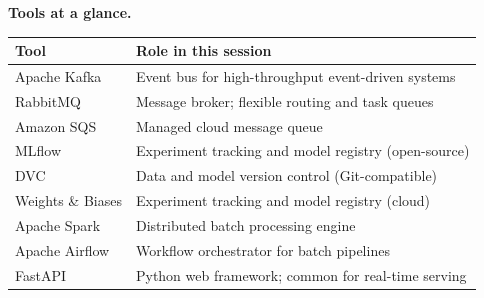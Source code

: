\documentclass[a4paper,11pt]{article}
\begin{document}
\medskip
\noindent\textbf{Tools at a glance.}
\begin{center}\small
\begin{tabular}{@{}p{3.8cm}p{9.0cm}@{}}
\toprule
\textbf{Tool} & \textbf{Role in this session} \\
\midrule
Apache Kafka     & Event bus for high-throughput event-driven systems \\
RabbitMQ         & Message broker; flexible routing and task queues \\
Amazon SQS       & Managed cloud message queue \\
MLflow           & Experiment tracking and model registry (open-source) \\
DVC              & Data and model version control (Git-compatible) \\
Weights \& Biases & Experiment tracking and model registry (cloud) \\
Apache Spark     & Distributed batch processing engine \\
Apache Airflow   & Workflow orchestrator for batch pipelines \\
FastAPI          & Python web framework; common for real-time serving \\
\bottomrule
\end{tabular}
\end{center}
\end{document}
